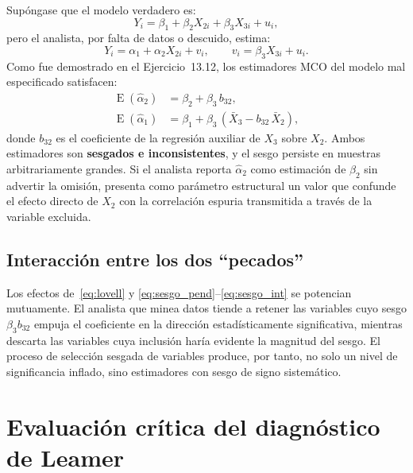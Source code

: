 \documentclass[12pt, letterpaper]{article}
\newcommand{\E}{\operatorname{E}}
\begin{document}
Supóngase que el modelo verdadero es:
\begin{equation}
  Y_i = \beta_1 + \beta_2 X_{2i} + \beta_3 X_{3i} + u_i,
  \label{eq:verdadero}
\end{equation}
pero el analista, por falta de datos o descuido, estima:
\begin{equation}
  Y_i = \alpha_1 + \alpha_2 X_{2i} + v_i, \qquad v_i = \beta_3 X_{3i} + u_i.
  \label{eq:omitido}
\end{equation}
Como fue demostrado en el Ejercicio~13.12, los estimadores MCO del modelo
mal especificado satisfacen:
\begin{align}
  \E(\hat{\alpha}_2) &= \beta_2 + \beta_3\,b_{32}, \label{eq:sesgo_pend}\\
  \E(\hat{\alpha}_1) &= \beta_1 + \beta_3\,(\bar{X}_3 - b_{32}\,\bar{X}_2),
  \label{eq:sesgo_int}
\end{align}
donde $b_{32}$ es el coeficiente de la regresión auxiliar de $X_3$ sobre
$X_2$. Ambos estimadores son \textbf{sesgados e inconsistentes}, y el sesgo
persiste en muestras arbitrariamente grandes. Si el analista reporta
$\hat{\alpha}_2$ como estimación de $\beta_2$ sin advertir la omisión,
presenta como parámetro estructural un valor que confunde el efecto
directo de $X_2$ con la correlación espuria transmitida a través de la
variable excluida.

\subsection{Interacción entre los dos ``pecados''}

Los efectos de~\eqref{eq:lovell} y \eqref{eq:sesgo_pend}--\eqref{eq:sesgo_int}
se potencian mutuamente. El analista que minea datos tiende a retener
las variables cuyo sesgo $\beta_3 b_{32}$ empuja el coeficiente en la
dirección estadísticamente significativa, mientras descarta las variables
cuya inclusión haría evidente la magnitud del sesgo. El proceso de
selección sesgada de variables produce, por tanto, no solo un nivel de
significancia inflado, sino estimadores con sesgo de signo sistemático.

\section{Evaluación crítica del diagnóstico de Leamer}
\end{document}
